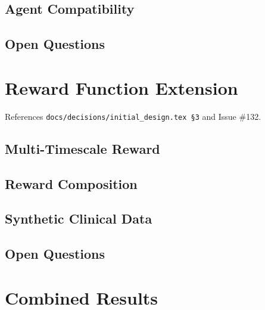 \documentclass[11pt]{article}
\begin{document}


\subsection{Agent Compatibility}



\subsection{Open Questions}



\section{Reward Function Extension}
\label{sec:reward}

References \texttt{docs/decisions/initial\_design.tex \S3} and Issue \#132.


\subsection{Multi-Timescale Reward}



\subsection{Reward Composition}



\subsection{Synthetic Clinical Data}



\subsection{Open Questions}



\section{Combined Results}

\end{document}
